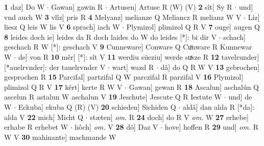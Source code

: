 \documentclass[8pt,a4paper,notitlepage]{article}
\begin{document}
\begin{table}[ht]
\begin{minipage}[t]{0.5\linewidth}
\textbf{1} daz] Do W  $\cdot$ Gawan] gawin R  $\cdot$ Artusen] Artuse R (W) (V) \textbf{2} sît] Sy R  $\cdot$ und] vnd auch W \textbf{3} vlîz] pris R \textbf{4} Melyanz] melianze Q Meliancz R melianz W V  $\cdot$ Liz] liesz Q leis W lis V \textbf{6} sprach] iach W  $\cdot$ Plymizol] plimizol Q R V \textbf{7} ouge] augen Q \textbf{8} leides doch ie] leides da R doch laides do W do leides [*]: bi dir V  $\cdot$ schach] geschach R W [*]: geschach V \textbf{9} Cunneware] Conware Q Cuͦnware R Kunnewar W  $\cdot$ de] von R \textbf{10} mêr] [*]: sît V \textbf{11} werdiu süeziu] werde suͯsze R \textbf{12} tavelrunder] [*auelrvnder]: der tauelrvnder V  $\cdot$ wart] wazd R  $\cdot$ dâ] do Q R W V \textbf{13} gebrochen] gesprochen R \textbf{15} Parcifal] partzifal Q W parczifal R parzifal V \textbf{16} Plymizol] plimizol Q R V \textbf{17} kêrt] kerte R W V  $\cdot$ Gawan] gewan R \textbf{18} Ascalun] aschalún Q ascelun R astalun W aschalun V \textbf{19} Jeschute] Jescute Q R Iestute W  $\cdot$ und] de W  $\cdot$ Eckuba] ekuba Q (R) (V) \textbf{20} schieden] Sichiden Q  $\cdot$ aldâ] dan alda R [*da]: alda V \textbf{22} mich] Micht Q  $\cdot$ stæten] \textit{om.} R \textbf{24} doch] do R V \textit{om.} W \textbf{27} erhebe] erhabe R erhebet W  $\cdot$ hôch] \textit{om.} V \textbf{28} dô] Daz V  $\cdot$ hove] hoffen R \textbf{29} und] \textit{om.} R W V \textbf{30} mahinante] machmande W \newline
\end{minipage}
\end{table}
\end{document}
